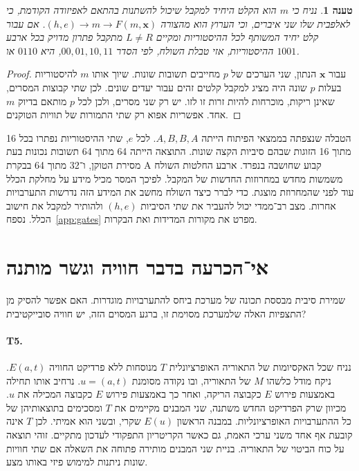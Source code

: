 \documentclass[11pt,a4paper]{article}
\DeclareRobustCommand{\textenglish}[1]{\foreignlanguage{english}{#1}}
\newtheorem{proposition}[theorem]{טענה}
\theoremstyle{definition}
\begin{document}
\begin{proposition}
נניח כי $m$ הוא הקלט היחיד למקבל שיכול להשתנות בהתאם לאפיזודה הקודמת, כי לאלפבית שלו שני איברים, וכי הערוץ הוא מהצורה $(h,e)\longrightarrow m\longrightarrow F(m,\mathbf{x})$. אם עבור קלט יחיד המשותף לכל ההיסטוריות ומקיים $L\ne R$ מתקבל פתרון מדויק בכל ארבע ההיסטוריות, אזי טבלת השולח, לפי הסדר $00,01,10,11$, היא $0110$ או $1001$.
\end{proposition}
\begin{proof}
עבור $\mathbf{x}$ הנתון, שני הערכים של $p$ מחייבים תשובות שונות. שיוך אותו $m$ להיסטוריות בעלות $p$ שונה היה מציג למקבל קלטים זהים עבור יעדים שונים. לכן שתי קבוצות המסרים, שאינן ריקות, מוכרחות להיות זרות זו לזו. יש רק שני מסרים, ולכן לכל $p$ מותאם בדיוק $m$ אחד. אפשריות אפוא רק שתי התמורות של תוויות הטוקנים.
\end{proof}

הטבלה שנצפתה בממצאי הפיתוח הייתה $A,B,B,A$. לכל $e$, שתי ההיסטוריות נפתרו בכל 16 מתוך 16 הזוגות שבהם סיביות הקצה שונות. התוצאה הייתה 64 מתוך 64 תשובות נכונות בעת מסירת הטוקן, ו־32 מתוך 64 בבקרת \textenglish{A} קבוע שחושבה בנפרד. ארבע החלטות השולח משמשות מחדש במחרוזות החדשות של המקבל. לפיכך המסר מכיל מידע על מחלקת הכלל עוד לפני שהמחרוזת מוצגת. כדי לברר כיצד השולח מחשב את המידע הזה נדרשות התערבויות אחרות. מצב רב־ממדי יכול להעביר את שתי הסיביות $(h,e)$ ולהותיר למקבל את חישוב הכלל. נספח~\ref{app:gates} מפרט את מקורות המדידות ואת הבקרות.

\section{אי־הכרעה בדבר חוויה וגשר מותנה}
\label{sec:boundary}
שמירת סיבית מבססת תכונה של מערכת ביחס להתערבויות מוגדרות. האם אפשר להסיק מן התצפיות האלה שלמערכת מסוימת זו, ברגע המסוים הזה, יש חוויה סובייקטיבית?

\paragraph{\textenglish{T5}.} נניח שכל האקסיומות של התאוריה האופרציונלית $T$ מנוסחות ללא פרדיקט החוויה $E(a,t)$. ניקח מודל כלשהו $M$ של התאוריה, ובו נקודה מסומנת $u=(a,t)$. נרחיב אותו תחילה באמצעות פירוש $E$ כקבוצה הריקה, ואחר כך באמצעות פירוש $E$ כקבוצה המכילה את $u$. מכיוון שרק הפרדיקט החדש משתנה, שני המבנים מקיימים את $T$ ומסכימים בתוצאותיהן של כל ההתערבויות האופרציונליות. במבנה הראשון $E(u)$ שקרי, ובשני הוא אמיתי. לכן $T$ אינה קובעת אף אחד משני ערכי האמת, גם כאשר הקריטריון התפקודי לעדכון מתקיים. זוהי תוצאה על כוח הביטוי של התאוריה. בניית שני המבנים מותירה פתוחה את השאלה אם שתי חוויות שונות ניתנות למימוש פיזי באותו מצע.
\end{document}
